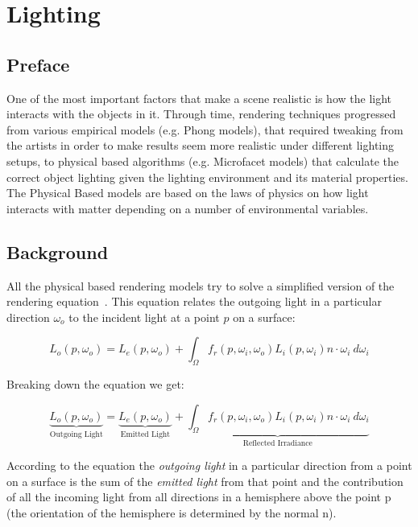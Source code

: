 \section{Lighting}
\subsection{Preface}
One of the most important factors that make a scene realistic is how the light interacts with the objects in it.
Through time, rendering techniques progressed from various empirical models (e.g. Phong models), that required
tweaking from the artists in order to make results seem more realistic under different lighting setups, to physical based
algorithms (e.g. Microfacet models) that calculate the correct object lighting given the lighting environment and
its material properties. The Physical Based models are based on the laws of physics on how light interacts with
matter depending on a number of environmental variables.

\subsection{Background}
All the physical based rendering models try to solve a simplified version of the rendering equation~\cite{lighting:ref32}.
This equation relates the outgoing light in a particular direction $\omega_o$ to the incident light at a point $p$ on a surface:

\begin{equation}
\label{eq:rendeq}
L_o(p,\omega_o) = L_e(p, \omega_o) + \int_\Omega f_r(p,\omega_i,\omega_o)L_i(p,\omega_i)n\cdot\omega_i \ d\omega_i
\end{equation}

\noindent Breaking down the equation we get:

\begin{equation}
\underbrace{L_o(p,\omega_o)}_\text{Outgoing Light} = \underbrace{L_e(p, \omega_o)}_\text{Emitted Light} + \underbrace{\int_\Omega f_r(p,\omega_i,\omega_o)L_i(p,\omega_i)n\cdot\omega_i \ d\omega_i}_\text{Reflected Irradiance}
\end{equation}

According to the equation the \textit{outgoing light} in a particular direction from a point on a surface is the
sum of the \textit{emitted light} from that point and the contribution of all the incoming light from all directions in a
hemisphere above the point p (the orientation of the hemisphere is determined by the normal n).

